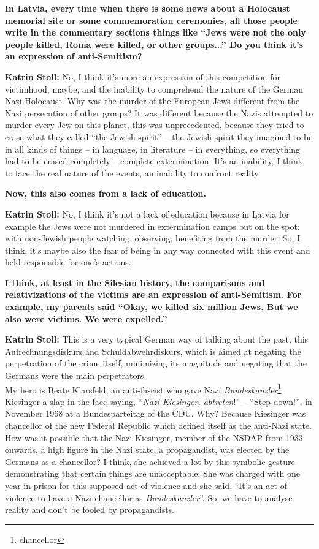 \textbf{In Latvia, every time when there is some news about a Holocaust memorial site or some commemoration ceremonies, all those people write in the commentary sections things like "`Jews were not the only people killed, Roma were killed, or other groups..."' Do you think it’s an expression of anti-Semitism?} 

\textbf{Katrin Stoll:} No, I think it’s more an expression of this competition for victimhood, maybe, and the inability to comprehend the nature of the German Nazi Holocaust. Why was the murder of the European Jews different from the Nazi persecution of other groups? It was different because the Nazis attempted to murder every Jew on this planet, this was unprecedented, because they tried to erase what they called "`the Jewish spirit"' – the Jewish spirit they imagined to be in all kinds of things – in language, in literature – in everything, so everything had to be erased completely – complete extermination. It’s an inability, I think, to face the real nature of the events, an inability to confront reality. 

\textbf{Now, this also comes from a lack of education.} 

\textbf{Katrin Stoll:} No, I think it’s not a lack of education because in Latvia for example the Jews were not murdered in extermination camps but on the spot: with non-Jewish people watching, observing, benefiting from the murder. So, I think, it’s maybe also the fear of being in any way connected with this event and held responsible for one’s actions. 

\textbf{I think, at least in the Silesian history, the comparisons and relativizations of the victims are an expression of anti-Semitism. For example, my parents said "`Okay, we killed six million Jews. But we also were victims. We were expelled."'}  

\textbf{Katrin Stoll:} This is a very typical German way of talking about the past, this Aufrechnungsdiskurs and Schuldabwehrdiskurs, which is aimed at negating the perpetration of the crime itself, minimizing its magnitude and negating that the Germans were the main perpetrators.\\
My hero is Beate Klarsfeld, an anti-fascist who gave Nazi \textit{Bundeskanzler}\footnote{chancellor} Kiesinger a slap in the face saying, "`\textit{Nazi Kiesinger, abtreten}!"' – "`Step down!"', in November 1968 at a Bundesparteitag of the CDU. Why? Because Kiesinger was chancellor of the new Federal Republic which defined itself as the anti-Nazi state. How was it possible that the Nazi Kiesinger, member of the NSDAP from 1933 onwards, a high figure in the Nazi state, a propagandist, was elected by the Germans as a chancellor?  I think, she achieved a lot by this symbolic gesture demonstrating that certain things are unacceptable. She was charged with one year in prison for this supposed act of violence and she said, "`It’s an act of violence to have a Nazi chancellor as \textit{Bundeskanzler}"'. So, we have to analyse reality and don’t be fooled by propagandists.  